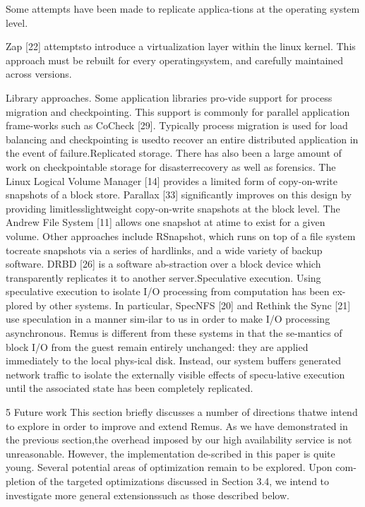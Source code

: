 Some attempts have been made to replicate applica-tions at the operating system level.

Zap [22] attemptsto introduce a virtualization layer within the linux kernel. This approach must be rebuilt for every operatingsystem, and carefully maintained across versions.

Library approaches. Some application libraries pro-vide support for process migration and checkpointing.
This support is commonly for parallel application frame-works such as CoCheck [29]. Typically process migration is used for load balancing and checkpointing is usedto recover an entire distributed application in the event of
failure.Replicated storage. There has also been a large
amount of work on checkpointable storage for disasterrecovery as well as forensics. The Linux Logical Volume Manager [14] provides a limited form of copy-on-write snapshots of a block store. Parallax [33] significantly improves on this design by providing limitlesslightweight copy-on-write snapshots at the block level.
The Andrew File System [11] allows one snapshot at atime to exist for a given volume. Other approaches include RSnapshot, which runs on top of a file system tocreate snapshots via a series of hardlinks, and a wide variety of backup software. DRBD [26] is a software ab-straction over a block device which transparently replicates it to another server.Speculative execution. Using speculative execution
to isolate I/O processing from computation has been ex-plored by other systems. In particular, SpecNFS [20] and
Rethink the Sync [21] use speculation in a manner sim-ilar to us in order to make I/O processing asynchronous.
Remus is different from these systems in that the se-mantics of block I/O from the guest remain entirely unchanged: they are applied immediately to the local phys-ical disk. Instead, our system buffers generated network
traffic to isolate the externally visible effects of specu-lative execution until the associated state has been completely replicated.

5 Future work
This section briefly discusses a number of directions thatwe intend to explore in order to improve and extend Remus. As we have demonstrated in the previous section,the overhead imposed by our high availability service
is not unreasonable. However, the implementation de-scribed in this paper is quite young. Several potential
areas of optimization remain to be explored. Upon com-pletion of the targeted optimizations discussed in Section 3.4, we intend to investigate more general extensionssuch as those described below.

